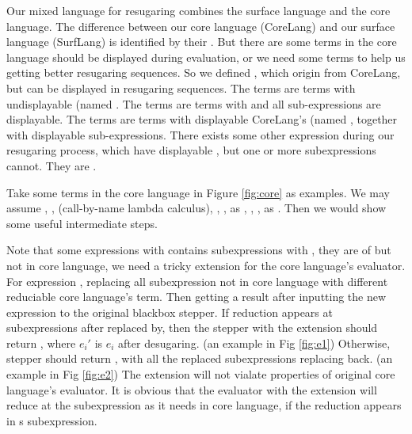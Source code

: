 Our mixed language for resugaring combines the surface language and the core language.
%
The difference between our core language (CoreLang) and our surface language (SurfLang) is identified by their . But there are some terms in the core language should be displayed during evaluation, or we need some terms to help us getting better resugaring sequences. So we defined , which origin from CoreLang, but can be displayed in resugaring sequences. The  terms are terms with undisplayable  (named . The  terms are terms with  and all sub-expressions are displayable. The  terms are terms with displayable CoreLang's  (named , together with displayable sub-expressions. There exists some other expression during our resugaring process, which have displayable , but one or more subexpressions cannot. They are .

Take some terms in the core language in Figure \ref{fig:core} as examples.
We may assume , ,  (call-by-name lambda calculus), , ,  as , , \m{$\lambda$},  as . Then we would show some useful intermediate steps.

Note that some expressions with  contains subexpressions with , they are of  but not in core language, we need a tricky extension for the core language's evaluator. For expression , replacing all subexpression not in core language with different reduciable core language's term. Then getting a result after inputting the new expression  to the original blackbox stepper. If reduction appears at subexpressions after  replaced by, then the stepper with the extension should return , where $e_i'$ is $e_i$ after desugaring. (an  example in Fig \ref{fig:e1}) Otherwise, stepper should return , with all the replaced subexpressions replacing back. (an example in Fig \ref{fig:e2}) The extension will not vialate properties of original core language's evaluator. It is obvious that the evaluator with the extension will reduce at the subexpression as it needs in core language, if the reduction appears in s subexpression.

